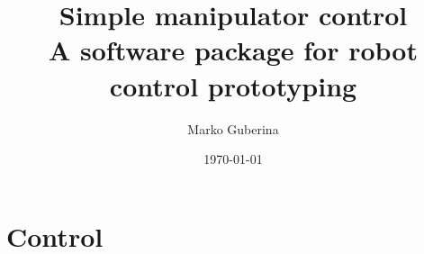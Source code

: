 \documentclass{report}
\title{Simple manipulator control \\
\large A software package for robot control prototyping}
\author{Marko Guberina}
\date{\today}
\begin{document}
\maketitle
\newpage
\tableofcontents
\newpage




%
%
\chapter{Control}












\appendix





\printbibliography
\end{document}
